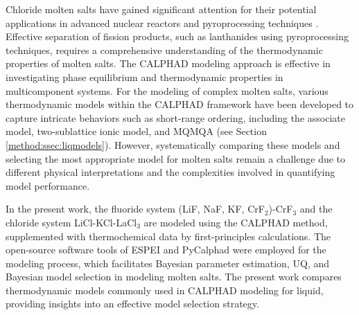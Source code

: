 Chloride molten salts have gained significant attention for their potential applications in advanced nuclear reactors and pyroprocessing techniques \cite{sridharan2012thermal, mourogov2006potentialities, iizuka1997actinides}. Effective separation of fission products, such as lanthanides using pyroprocessing techniques, requires a comprehensive understanding of the thermodynamic properties of molten salts. The CALPHAD  modeling approach \cite{liu2020computational, lukas2007computational} is effective in investigating phase equilibrium and thermodynamic properties in multicomponent systems. For the modeling of complex molten salts, various thermodynamic models within the CALPHAD framework have been developed to capture intricate behaviors such as short-range ordering, including the associate model, two-sublattice ionic model, and MQMQA (see Section \ref{method:ssec:liqmodels}). However, systematically comparing these models and selecting the most appropriate model for molten salts remain a challenge due to different physical interpretations and the complexities involved in quantifying model performance.

In the present work, the fluoride system (LiF, NaF, KF, CrF${_2}$)-CrF${_3}$ and the chloride system LiCl-KCl-LaCl${_3}$ are modeled using the CALPHAD method, supplemented with thermochemical data by first-principles calculations. The open-source software tools of ESPEI \cite{bocklund2019espei} and PyCalphad \cite{otis2017pycalphad} were employed for the modeling process, which facilitates Bayesian parameter estimation, UQ, and Bayesian model selection in modeling molten salts. The present work compares thermodynamic models commonly used in CALPHAD modeling for liquid, providing insights into an effective model selection strategy. 

